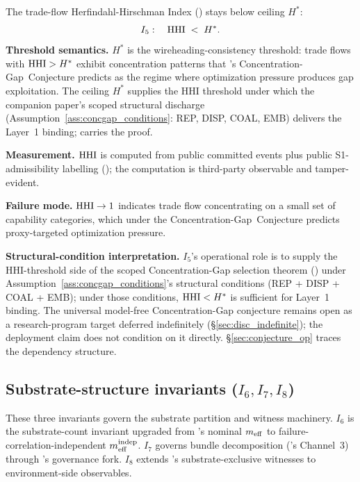 \begin{definition}
\label{inv:I5}
The trade-flow Herfindahl-Hirschman Index
(\citep[Definition of trade-flow HHI]{lasser2026paper8b}) stays below
ceiling $H^*$:
\[
  I_5: \quad \mathrm{HHI} \;<\; H^*.
\]
\textbf{Threshold semantics.} $H^*$ is the wireheading-consistency threshold:
    trade flows with $\mathrm{HHI} > H^*$ exhibit concentration patterns that
    \citep[Microfoundation]{lasser2026micro}'s Concentration-Gap~Conjecture predicts as the
    regime where optimization pressure produces gap exploitation. The ceiling
    $H^*$ supplies the HHI threshold under which the companion paper's scoped
    structural discharge (Assumption~\ref{ass:concgap_conditions}: REP, DISP,
    COAL, EMB) delivers the Layer~1 binding;
    \citep[Theorem~2]{lasser2026foundations} carries the proof.

\textbf{Measurement.} $\mathrm{HHI}$ is computed from public committed events plus
    public S1-admissibility labelling (\citep[Part-A category-flow
    variant]{lasser2026paper8b}); the computation is third-party observable and
    tamper-evident.

\textbf{Failure mode.} $\mathrm{HHI} \to 1$ indicates trade flow concentrating on a
    small set of capability categories, which under the Concentration-Gap~Conjecture predicts
    proxy-targeted optimization pressure.

\textbf{Structural-condition interpretation.} $I_5$'s operational
    role is to supply the HHI-threshold side of the scoped
    Concentration-Gap selection theorem
    (\citep[Theorem~2]{lasser2026foundations}) under
    Assumption~\ref{ass:concgap_conditions}'s structural
    conditions (REP + DISP + COAL + EMB); under those conditions,
    $\mathrm{HHI} < H^*$ is sufficient for Layer~1 binding. The universal
    model-free Concentration-Gap conjecture remains open as a
    research-program target deferred indefinitely
    (\S\ref{sec:disc_indefinite}); the deployment claim does not
    condition on it directly. \S\ref{sec:conjecture_op} traces
    the dependency structure.
\end{definition}

\subsection{Substrate-structure invariants (\texorpdfstring{$I_6, I_7, I_8$}{I6, I7, I8})}
\label{sec:substrate_invariants}

These three invariants govern the substrate partition and
witness machinery. $I_6$ is the substrate-count invariant upgraded
from \citep[Phase~Redundancy]{lasser2026phase}'s nominal $m_{\mathrm{eff}}$ to failure-correlation-independent
$m_{\mathrm{eff}}^{\mathrm{indep}}$. $I_7$ governs bundle decomposition (\citep[Microfoundation]{lasser2026micro}'s Channel~3)
through \citep[Exogenous~Verification]{lasser2026exo}'s governance fork. $I_8$ extends \citep[Exogenous~Verification]{lasser2026exo}'s
substrate-exclusive witnesses to environment-side observables.

